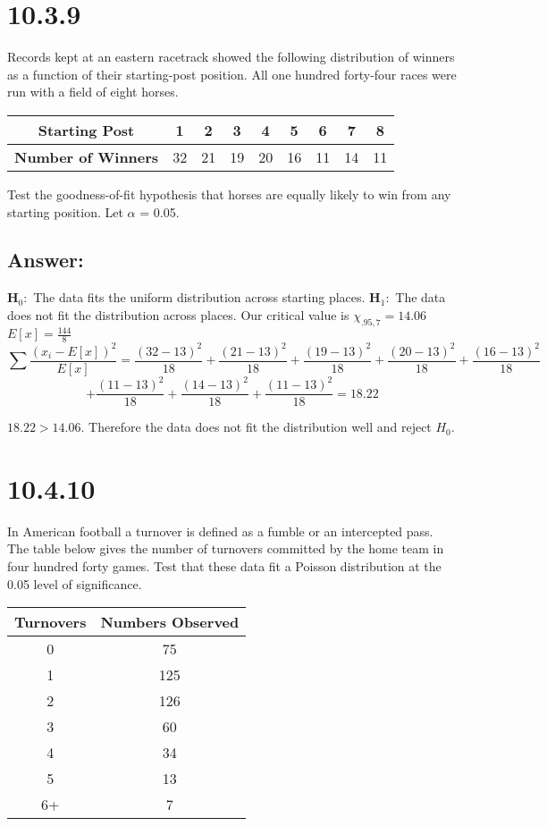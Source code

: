 \documentclass[svgnames]{article}
\begin{document}
\section{10.3.9}
Records kept at an eastern racetrack showed the following distribution of winners as a function of their starting-post position. All one hundred forty-four races were run with a field of eight horses. 
\begin{table}[h!]
\centering
 \begin{tabular}{c c c c c c c c c} 

\textbf{Starting Post}      \vline & 1 & 2 & 3 & 4 & 5 & 6  & 7 & 8\\
 \hline
 \textbf{Number of Winners} \vline & 32 & 21 &19 & 20 & 16 & 11 &14 &11 \\
 \end{tabular}
\end{table}

Test the goodness-of-fit hypothesis that horses are equally likely to win from any starting position. Let $\alpha$ = 0.05.

\subsection*{Answer:}
\textbf{H$_0:$} The data fits the uniform distribution across starting places.
\newline
\textbf{H$_1:$} The data does not fit the distribution across places.
\newline
Our critical value is $\chi_{.95,7}=14.06$
$E[x] = \frac{144}{8}$
$$\sum \frac{(x_i - E[x])^2}{E[x]} = \frac{(32-13)^2}{18} + \frac{(21-13)^2}{18}+ \frac{(19-13)^2}{18}+ \frac{(20-13)^2}{18}+ \frac{(16-13)^2}{18}$$
$$+ \frac{(11-13)^2}{18}+ \frac{(14-13)^2}{18}+\frac{(11-13)^2}{18}=18.22$$

$18.22>14.06$. Therefore the data does not fit the distribution well and reject $H_0$. 

\section{10.4.10}
 In American football a turnover is defined as a fumble or an intercepted pass. The table below gives the number of turnovers committed by the home team in four hundred forty games. Test that these data fit a Poisson distribution at the 0.05 level of significance.

\begin{table}[h!]
\centering
 \begin{tabular}{c c} 
\hline
\textbf{Turnovers} & \textbf{Numbers Observed}\\
\hline
0 & 75 \\
1 & 125 \\
2 & 126 \\
3 & 60 \\
4 & 34 \\
5 & 13 \\
6+ & 7 \\
 \end{tabular}
\end{table}
\end{document}
